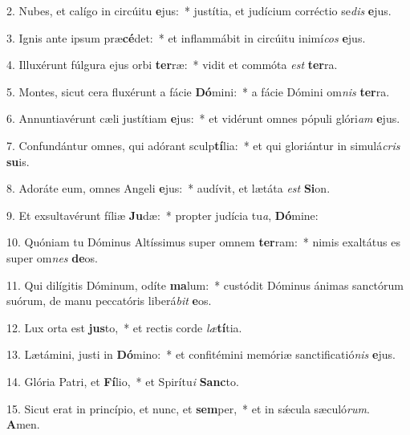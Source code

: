 2. Nubes, et calígo in circúitu \textbf{e}jus:~*  justítia, et judícium corréctio se\textit{dis} \textbf{e}jus.\

3. Ignis ante ipsum præ\textbf{cé}det:~*  et inflammábit in circúitu inimí\textit{cos} \textbf{e}jus.\

4. Illuxérunt fúlgura ejus orbi \textbf{ter}ræ:~*  vidit et commóta \textit{est} \textbf{ter}ra.\

5. Montes, sicut cera fluxérunt a fácie \textbf{Dó}mini:~*  a fácie Dómini om\textit{nis} \textbf{ter}ra.\

6. Annuntiavérunt cæli justítiam \textbf{e}jus:~*  et vidérunt omnes pópuli glóri\textit{am} \textbf{e}jus.\

7. Confundántur omnes, qui adórant sculp\textbf{tí}lia:~*  et qui gloriántur in simulá\textit{cris} \textbf{su}is.\

8. Adoráte eum, omnes Angeli \textbf{e}jus:~*  audívit, et lætáta \textit{est} \textbf{Si}on.\

9. Et exsultavérunt fíliæ \textbf{Ju}dæ:~*  propter judícia tu\textit{a}, \textbf{Dó}mine:\

10. Quóniam tu Dóminus Altíssimus super omnem \textbf{ter}ram:~*  nimis exaltátus es super om\textit{nes} \textbf{de}os.\

11. Qui dilígitis Dóminum, odíte \textbf{ma}lum:~*  custódit Dóminus ánimas sanctórum suórum, de manu peccatóris liberá\textit{bit} \textbf{e}os.\

12. Lux orta est \textbf{jus}to,~*  et rectis corde \textit{læ}\textbf{tí}tia.\

13. Lætámini, justi in \textbf{Dó}mino:~*  et confitémini memóriæ sanctificatió\textit{nis} \textbf{e}jus.\

14. Glória Patri, et \textbf{Fí}lio,~*  et Spirítu\textit{i} \textbf{Sanc}to.\

15. Sicut erat in princípio, et nunc, et \textbf{sem}per,~*  et in sǽcula sæculó\textit{rum}. \textbf{A}men.\

